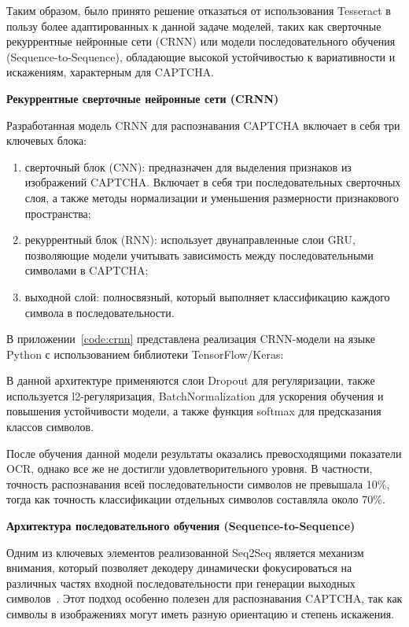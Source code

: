Таким образом, было принято решение отказаться от использования Tesseract в 
пользу более адаптированных к данной задаче моделей, таких как сверточные 
рекуррентные нейронные сети (CRNN) или модели последовательного обучения 
(Sequence-to-Sequence), обладающие высокой устойчивостью к вариативности и 
искажениям, характерным для CAPTCHA.

\textbf{Рекуррентные сверточные нейронные сети (CRNN)}

Разработанная модель CRNN для распознавания CAPTCHA включает в себя три ключевых 
блока:

\begin{enumerate}
    \item сверточный блок (CNN): предназначен для выделения признаков из 
    изображений CAPTCHA. Включает в себя три последовательных сверточных слоя, а 
    также методы нормализации и уменьшения размерности признакового пространства;
    \item рекуррентный блок (RNN): использует двунаправленные слои GRU, 
    позволяющие модели учитывать зависимость между последовательными символами в 
    CAPTCHA;
    \item выходной слой: полносвязный, который выполняет классификацию каждого 
    символа в последовательности.
\end{enumerate}

В приложении~\ref{code:crnn} представлена реализация CRNN-модели на языке Python 
с использованием библиотеки TensorFlow/Keras:

В данной архитектуре применяются слои Dropout для регуляризации, также 
используется l2-регуляризация, BatchNormalization для ускорения обучения и 
повышения устойчивости модели, а также функция softmax для предсказания классов 
символов.

После обучения данной модели результаты оказались превосходящими показатели OCR, 
однако все же не достигли удовлетворительного уровня. В частности, точность 
распознавания всей последовательности символов не превышала 10\%, тогда как 
точность классификации отдельных символов составляла около 70\%.

\textbf{Архитектура последовательного обучения (Sequence-to-Sequence)}

Одним из ключевых элементов реализованной Seq2Seq является механизм внимания, 
который позволяет декодеру динамически фокусироваться на различных частях входной 
последовательности при генерации выходных символов~\cite{Seq2SeqBook}. Этот 
подход особенно полезен для распознавания CAPTCHA, так как символы в изображениях 
могут иметь разную ориентацию и степень искажения.

